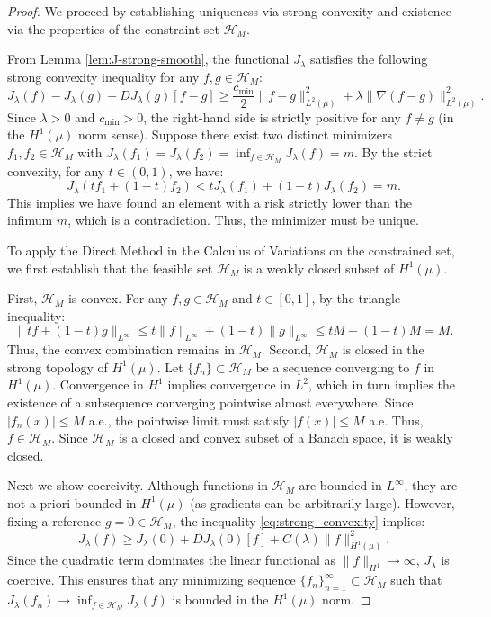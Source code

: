 \documentclass[11pt]{article}
\newcommand{\cH}{\mathcal{H}}
\theoremstyle{plain}
\theoremstyle{definition}
\theoremstyle{remark}
\begin{document}
\begin{proof}
 We proceed by establishing uniqueness via strong convexity and existence via the properties of the constraint set $\cH_M$.


From Lemma \ref{lem:J-strong-smooth}, the functional $J_{\lambda}$ satisfies the following strong convexity inequality for any $f, g \in \cH_M$:
\begin{equation} \label{eq:strong_convexity}
    J_{\lambda}(f) - J_{\lambda}(g) - DJ_{\lambda}(g)[f-g] \ge \frac{c_{\min}}{2}\|f-g\|_{L^{2}(\mu)}^{2} + \lambda\|\nabla(f-g)\|_{L^{2}(\mu)}^{2}.
\end{equation}
Since $\lambda > 0$ and $c_{\min} > 0$, the right-hand side is strictly positive for any $f \neq g$ (in the $H^1(\mu)$ norm sense).
Suppose there exist two distinct minimizers $f_1, f_2 \in \cH_M$ with $J_{\lambda}(f_1) = J_{\lambda}(f_2) = \inf_{f \in \cH_M} J_{\lambda}(f) = m$. By the strict convexity, for any $t \in (0, 1)$, we have:
\begin{equation*}
    J_{\lambda}(t f_1 + (1-t)f_2) < t J_{\lambda}(f_1) + (1-t)J_{\lambda}(f_2) = m.
\end{equation*}
This implies we have found an element with a risk strictly lower than the infimum $m$, which is a contradiction. Thus, the minimizer must be unique.

To apply the Direct Method in the Calculus of Variations
\cite{evans2022partial} on the constrained set, we first establish that the
feasible set $\cH_M$ is a weakly closed subset of $H^1(\mu)$.


First, $\cH_M$ is convex. For any $f, g \in \cH_M$ and $t \in [0, 1]$, by the triangle inequality:
\begin{equation*}
    \|t f + (1-t)g\|_{L^\infty} \le t\|f\|_{L^\infty} + (1-t)\|g\|_{L^\infty} \le tM + (1-t)M = M.
\end{equation*}
Thus, the convex combination remains in $\cH_M$.
Second, $\cH_M$ is closed in the strong topology of $H^1(\mu)$. Let $\{f_n\} \subset \cH_M$ be a sequence converging to $f$ in $H^1(\mu)$. Convergence in $H^1$ implies convergence in $L^2$, which in turn implies the existence of a subsequence converging pointwise almost everywhere. Since $|f_n(x)| \le M$ a.e., the pointwise limit must satisfy $|f(x)| \le M$ a.e. Thus, $f \in \cH_M$.
Since $\cH_M$ is a closed and convex subset of a Banach space, it is weakly closed.

Next we show coercivity.
Although functions in $\mathcal{H}_M$ are bounded in $L^\infty$, they are not a priori bounded in $H^1(\mu)$ (as gradients can be arbitrarily large). However, fixing a reference $g=0 \in \cH_M$, the inequality \eqref{eq:strong_convexity} implies:
\begin{equation*}
    J_{\lambda}(f) \ge J_{\lambda}(0) + DJ_{\lambda}(0)[f] + C(\lambda) \|f\|_{H^1(\mu)}^2.
\end{equation*}
Since the quadratic term dominates the linear functional as $\|f\|_{H^1} \to \infty$, $J_{\lambda}$ is coercive. This ensures that any minimizing sequence $\{f_n\}_{n=1}^\infty \subset \cH_M$ such that $J_{\lambda}(f_n) \to \inf_{f \in \cH_M} J_{\lambda}(f)$ is bounded in the $H^1(\mu)$ norm.


\end{proof}
\end{document}

